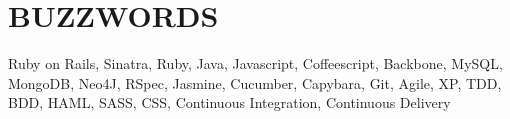 \documentclass{res}
\begin{document}
\begin{resume}
\begin{itemize}
 \end{itemize}

\vspace{0.05in}         
\section{BUZZWORDS}\vspace{0.15in}
Ruby on Rails, Sinatra, Ruby, Java, Javascript, Coffeescript, Backbone, MySQL, MongoDB, Neo4J, RSpec, Jasmine, Cucumber, Capybara, Git, Agile, XP, TDD, BDD, HAML, SASS, CSS, Continuous Integration, Continuous Delivery 
 
\end{resume}
\end{document}
